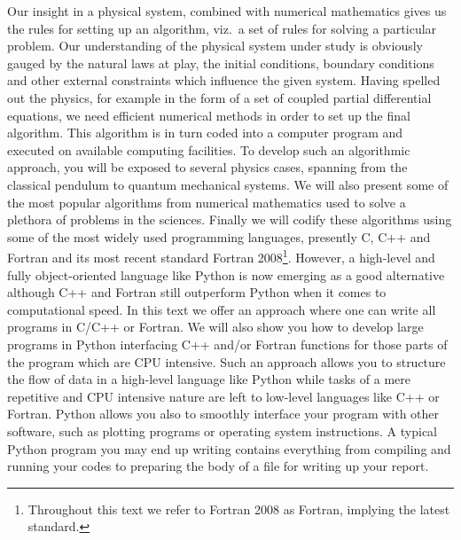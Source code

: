 Our insight in a physical system, combined with numerical mathematics
gives us the rules for setting up an algorithm, viz.~a set of rules
for solving a particular problem.  Our understanding of the physical
system under study is obviously gauged by the natural laws at play,
the initial conditions, boundary conditions and other external
constraints which influence the given system. Having spelled out the
physics, for example in the form of a set of coupled partial
differential equations, we need efficient numerical methods in order
to set up the final algorithm.  This algorithm is in turn coded into a
computer program and executed on available computing facilities.  To
develop such an algorithmic approach, you will be exposed to several
physics cases, spanning from the classical pendulum to quantum
mechanical systems. We will also present some of the most popular
algorithms from numerical mathematics used to solve a plethora of
problems in the sciences.  Finally we will codify these algorithms
using some of the most widely used programming languages, presently C,
C++ and Fortran and its most recent standard Fortran
2008\footnote{Throughout this text we refer to Fortran 2008 as
Fortran, implying the latest standard.}. However, a high-level and fully
object-oriented language like Python is now emerging as a good
alternative although C++ and Fortran still outperform Python when it
comes to computational speed.  In this text we offer an approach where
one can write all programs in C/C++ or Fortran.  We will also show you
how to develop large programs in Python interfacing C++ and/or Fortran
functions for those parts of the program which are CPU intensive.
Such an approach allows you to structure the flow of data in a
high-level language like Python while tasks of a mere repetitive and
CPU intensive nature are left to low-level languages like C++ or
Fortran. Python allows you also to smoothly interface your program
with other software, such as plotting programs or operating system
instructions. A typical Python program you may end up writing contains
everything from compiling and running your codes to preparing the body
of a file for writing up your report.



